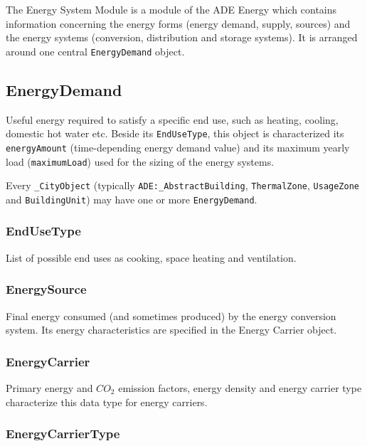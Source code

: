 \documentclass[a4paper,12pt]{article}
\begin{document}
The Energy System Module is a module of the ADE Energy which contains
information concerning the energy forms (energy demand, supply, sources)
and the energy systems (conversion, distribution and storage systems).
It is arranged around one central \texttt{EnergyDemand} object.

\subsection{EnergyDemand}\label{energydemand}

Useful energy required to satisfy a specific end use, such as heating,
cooling, domestic hot water etc. Beside its \texttt{EndUseType}, this
object is characterized its \texttt{energyAmount} (time-depending energy
demand value) and its maximum yearly load (\texttt{maximumLoad}) used
for the sizing of the energy systems.

Every \texttt{\_CityObject} (typically \texttt{ADE:\_AbstractBuilding},
\texttt{ThermalZone}, \texttt{UsageZone} and \texttt{BuildingUnit}) may
have one or more \texttt{EnergyDemand}.

\subsubsection{EndUseType}\label{endusetype}

List of possible end uses as cooking, space heating and ventilation.

\subsubsection{EnergySource}\label{energysource}

Final energy consumed (and sometimes produced) by the energy conversion
system. Its energy characteristics are specified in the Energy Carrier
object.

\subsubsection{EnergyCarrier}\label{energycarrier}

Primary energy and \(CO_2\) emission factors, energy density and energy
carrier type characterize this data type for energy carriers.

\subsubsection{EnergyCarrierType}\label{energycarriertype}
\end{document}
